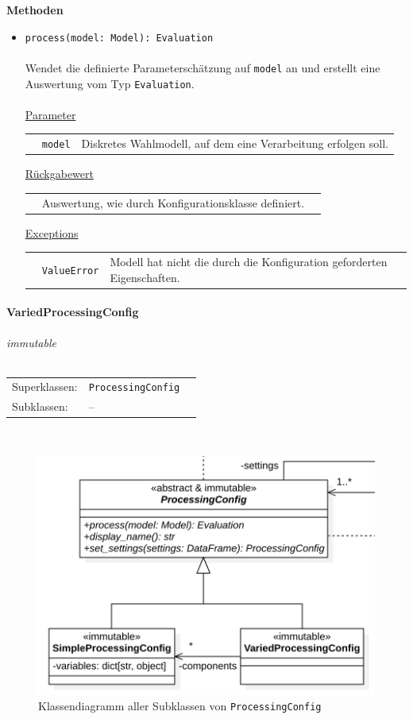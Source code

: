\documentclass{article}
\newcommand{\classheader}[2][]{\paragraph{#2}
\mbox{}\textit{#1}\\\\}
\begin{document}
\textbf{Methoden}
\begin{itemize}\setlength\itemsep{3em}
\item \texttt{process(model: Model): Evaluation}\\\\
Wendet die definierte Parameterschätzung auf \texttt{model} an und erstellt eine Auswertung vom Typ \texttt{Evaluation}.
\\\\
\underline{Parameter}\\
\begin{tabular}{lll}
 & \texttt{model} & Diskretes Wahlmodell, auf dem eine Verarbeitung erfolgen soll.\\
\end{tabular}

\underline{Rückgabewert}\\
\begin{tabular}{lll}
 & Auswertung, wie durch Konfigurationsklasse definiert.\\
\end{tabular}

\underline{Exceptions}\\
\begin{tabular}{lll}
 & \texttt{ValueError} & Modell hat nicht die durch die Konfiguration geforderten Eigenschaften.\\
\end{tabular}
\end{itemize}

\newpage
\classheader[\flqq{}immutable\frqq]{VariedProcessingConfig}\label{cls:VariedProcessingConfig}
\begin{tabular}{lll}
 Superklassen: & \texttt{ProcessingConfig}\\
 Subklassen: & --
\end{tabular}\\
\begin{figure}[H]%
    \centering
    \includegraphics[width=13cm]{entwurf/Entwurf_dokument/img/cls/model/ProcessingConfigs.png}
    \caption{Klassendiagramm aller Subklassen von \texttt{ProcessingConfig}}
\end{figure}
\end{document}
